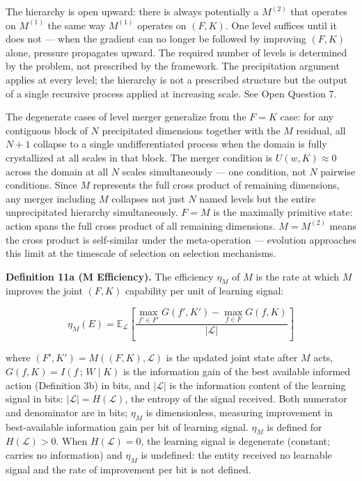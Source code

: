 \documentclass[
]{article}
\begin{document}
The hierarchy is open upward: there is always potentially a \(M^{(2)}\)
that operates on \(M^{(1)}\) the same way \(M^{(1)}\) operates on
\((F, K)\). One level suffices until it does not --- when the gradient
can no longer be followed by improving \((F, K)\) alone, pressure
propagates upward. The required number of levels is determined by the
problem, not prescribed by the framework. The precipitation argument
applies at every level; the hierarchy is not a prescribed structure but
the output of a single recursive process applied at increasing scale.
See Open Question 7.

The degenerate cases of level merger generalize from the \(F = K\) case:
for any contiguous block of \(N\) precipitated dimensions together with
the \(M\) residual, all \(N+1\) collapse to a single undifferentiated
process when the domain is fully crystallized at all scales in that
block. The merger condition is \(U(w, K) \approx 0\) across the domain
at all \(N\) scales simultaneously --- one condition, not \(N\) pairwise
conditions. Since \(M\) represents the full cross product of remaining
dimensions, any merger including \(M\) collapses not just \(N\) named
levels but the entire unprecipitated hierarchy simultaneously. \(F = M\)
is the maximally primitive state: action spans the full cross product of
all remaining dimensions. \(M = M^{(2)}\) means the cross product is
self-similar under the meta-operation --- evolution approaches this
limit at the timescale of selection on selection mechanisms.

\textbf{Definition 11a (M Efficiency).} The efficiency \(\eta_M\) of
\(M\) is the rate at which \(M\) improves the joint \((F, K)\)
capability per unit of learning signal:

\[\eta_M(E) = \mathbb{E}_{\mathcal{L}} \left[ \frac{\max_{f' \in F'} G(f', K') - \max_{f \in F} G(f, K)}{|\mathcal{L}|} \right]\]

where \((F', K') = M((F, K), \mathcal{L})\) is the updated joint state
after \(M\) acts, \(G(f, K) = I(f\,;\, W \mid K)\) is the information
gain of the best available informed action (Definition 3b) in bits, and
\(|\mathcal{L}|\) is the information content of the learning signal in
bits: \(|\mathcal{L}| = H(\mathcal{L})\), the entropy of the signal
received. Both numerator and denominator are in bits; \(\eta_M\) is
dimensionless, measuring improvement in best-available information gain
per bit of learning signal. \(\eta_M\) is defined for
\(H(\mathcal{L}) > 0\). When \(H(\mathcal{L}) = 0\), the learning signal
is degenerate (constant; carries no information) and \(\eta_M\) is
undefined: the entity received no learnable signal and the rate of
improvement per bit is not defined.
\end{document}
